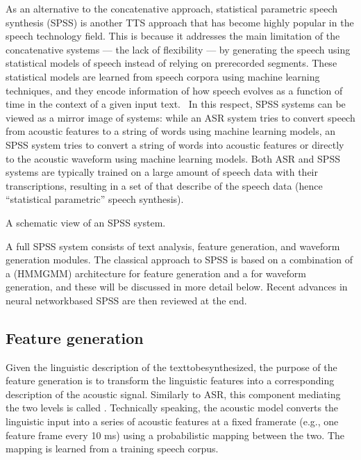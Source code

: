 \documentclass[letterpaper,10pt,english]{jupyterBook}
\begin{document}
\sphinxAtStartPar
As an alternative to the concatenative approach, statistical parametric
speech synthesis (SPSS) is another TTS approach that has become highly
popular in the speech technology field. This is because it addresses the
main limitation of the concatenative systems — the lack of flexibility —
by generating the speech using statistical models of speech instead of
relying on pre\sphinxhyphen{}recorded segments. These statistical models are learned
from speech corpora using machine learning techniques, and they encode
information of how speech evolves as a function of time in the context
of a given input text.  In this respect, SPSS systems can be viewed as a
mirror image of  systems: while an ASR system
tries to convert speech from acoustic features to a string of words
using machine learning models, an SPSS system tries to convert a string
of words into acoustic features or directly to the acoustic waveform
using machine learning models. Both ASR and SPSS systems are typically
trained on a large amount of speech data with their transcriptions,
resulting in a set of  that describe  of the speech data (hence “statistical parametric”
speech synthesis).

\sphinxAtStartPar
{}
 A schematic view of an SPSS system.

\sphinxAtStartPar
A full SPSS system consists of text analysis, feature generation, and
waveform generation modules. The classical approach to SPSS is based on
a combination of a 
(HMM\sphinxhyphen{}GMM) architecture for feature generation and a  for
waveform generation, and these will be discussed in more detail below.
Recent advances in neural network\sphinxhyphen{}based SPSS are then reviewed at the
end.


\subsection{Feature generation}
\label{\detokenize{Synthesis/Statistical_parametric_speech_synthesis:feature-generation}}
\sphinxAtStartPar
Given the linguistic description of the text\sphinxhyphen{}to\sphinxhyphen{}be\sphinxhyphen{}synthesized, the
purpose of the feature generation is to transform the linguistic
features into a corresponding description of the acoustic signal.
Similarly to ASR, this component mediating the two levels is called . Technically speaking, the acoustic model converts the
linguistic input into a series of acoustic features at a fixed
frame\sphinxhyphen{}rate (e.g., one feature frame every 10 ms) using a probabilistic
mapping between the two. The mapping is learned from a training speech
corpus.
\end{document}
